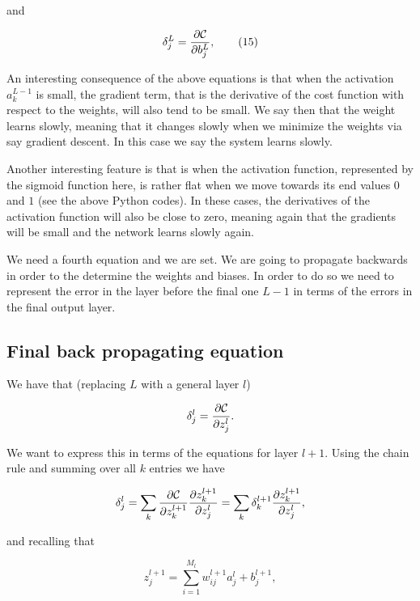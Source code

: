\documentclass[11pt]{article}
\begin{document}
    and

    \hypertarget{_auto10}{}

\[
\begin{equation}
\delta_j^L = \frac{\partial {\cal C}}{\partial b_j^L},
\label{_auto10} \tag{15}
\end{equation}
\]

    An interesting consequence of the above equations is that when the
activation \(a_k^{L-1}\) is small, the gradient term, that is the
derivative of the cost function with respect to the weights, will also
tend to be small. We say then that the weight learns slowly, meaning
that it changes slowly when we minimize the weights via say gradient
descent. In this case we say the system learns slowly.

Another interesting feature is that is when the activation function,
represented by the sigmoid function here, is rather flat when we move
towards its end values \(0\) and \(1\) (see the above Python codes). In
these cases, the derivatives of the activation function will also be
close to zero, meaning again that the gradients will be small and the
network learns slowly again.

We need a fourth equation and we are set. We are going to propagate
backwards in order to the determine the weights and biases. In order to
do so we need to represent the error in the layer before the final one
\(L-1\) in terms of the errors in the final output layer.

\hypertarget{final-back-propagating-equation}{%
\subsection{Final back propagating
equation}\label{final-back-propagating-equation}}

We have that (replacing \(L\) with a general layer \(l\))

    \[
\delta_j^l =\frac{\partial {\cal C}}{\partial z_j^l}.
\]

    We want to express this in terms of the equations for layer \(l+1\).
Using the chain rule and summing over all \(k\) entries we have

    \[
\delta_j^l =\sum_k \frac{\partial {\cal C}}{\partial z_k^{l+1}}\frac{\partial z_k^{l+1}}{\partial z_j^{l}}=\sum_k \delta_k^{l+1}\frac{\partial z_k^{l+1}}{\partial z_j^{l}},
\]

    and recalling that

    \[
z_j^{l+1} = \sum_{i=1}^{M_{l}}w_{ij}^{l+1}a_j^{l}+b_j^{l+1},
\]
\end{document}
